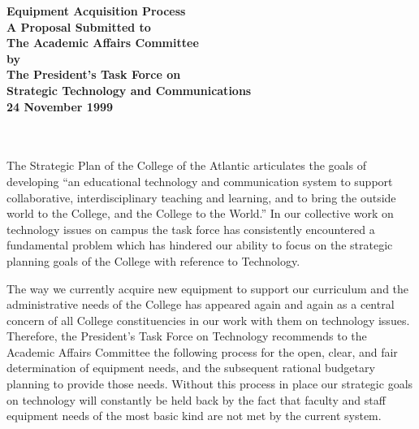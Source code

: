 \oddsidemargin=0in
\textwidth=6.75in
\textheight=7.5in

\renewcommand{\arraystretch}{1.3}


\pagestyle{empty}
\begin{center}
\bigskip
{\Large {\bf Equipment Acquisition Process }}\\
\bigskip
\bigskip
{\large {\bf A Proposal Submitted to }}\\
\bigskip
{\large {\bf The Academic Affairs Committee}}\\
\bigskip
{\large {\bf by}}\\
\bigskip
{\large {\bf The President's Task Force on}}\\
\smallskip
{\large {\bf Strategic Technology and Communications }}\\
\medskip
\bigskip
{\bf {\large 24 November 1999}}\\
\end{center}
\smallskip
\hspace{2mm}\\

 \\

The Strategic Plan of the College of the Atlantic articulates the
goals of developing ``an educational technology and communication
system to support collaborative, interdisciplinary teaching and
learning, and to bring the outside world to the College, and the
College to the World.''  In our collective work on technology issues
on campus the task force has consistently encountered a fundamental
problem which has hindered our ability to focus on the strategic
planning goals of the College with reference to Technology. 

     The way we currently acquire new equipment to support our
curriculum and the administrative needs of the College has
appeared again and again as a central concern of all College
constituencies in our work with them on technology issues.  Therefore,
the President's Task Force on Technology recommends to the Academic
Affairs Committee the following process for the open, clear, and fair
determination of equipment needs, and the subsequent rational budgetary
planning to provide those needs.  Without this process in place our
strategic goals on technology will constantly be held back by the fact
that faculty and staff equipment needs of the most basic kind are not
met by the current system. \\
\bigskip


